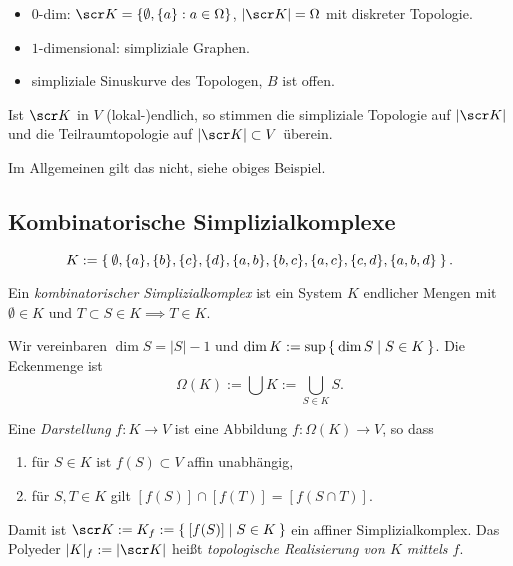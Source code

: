 \begin{ex}[Gegenbeispiele]
\end{ex}

\begin{ex}
	\begin{itemize}
		\item
			$0$-dim: $\scr K = \{ \emptyset, \{a\} : a \in \Omega \}$, $|\scr K| = \Omega$ mit diskreter Topologie.
		\item
			$1$-dimensional: simpliziale Graphen.
		\item
			simpliziale Sinuskurve des Topologen, $B$ ist offen.
	\end{itemize}
\end{ex}

\begin{nt}
	Ist $\scr K$ in $V$ (lokal-)endlich, so stimmen die simpliziale Topologie auf $|\scr K|$ und die Teilraumtopologie auf $|\scr K| \subset V$ überein.

	Im Allgemeinen gilt das nicht, siehe obiges Beispiel.
\end{nt}


\subsection{Kombinatorische Simplizialkomplexe}

\[
	K := \Set{ \emptyset, \{a\}, \{b\}, \{c\}, \{d\}, \{a,b\}, \{b,c\}, \{a,c\}, \{c,d\}, \{a,b,d\} }.
\]

\begin{df}
	Ein \emph{kombinatorischer Simplizialkomplex} ist ein System $K$ endlicher Mengen mit $\emptyset \in K$ und $T \subset S \in K \implies T \in K$.

	Wir vereinbaren $\dim S = |S| - 1$ und $\dim K := \sup \Set{ \dim S | S \in K }$.
	Die Eckenmenge ist
	\[
		\Omega(K) := \bigcup K := \bigcup_{S \in K} S.
	\]
\end{df}

\begin{df}
	Eine \emph{Darstellung} $f: K \to V$ ist eine Abbildung $f: \Omega(K) \to V$, so dass
	\begin{enumerate}[1)]
		\item
			für $S \in K$ ist $f(S) \subset V$ affin unabhängig,
		\item
			für $S, T \in K$ gilt $[f(S)] \cap [f(T)] = [f(S \cap T)]$.
	\end{enumerate}
	Damit ist $\scr K := K_f := \Set{ [f(S)] | S \in K }$ ein affiner Simplizialkomplex.
	Das Polyeder $|K|_f := |\scr K|$ heißt \emph{topologische Realisierung von $K$ mittels $f$}.
\end{df}

